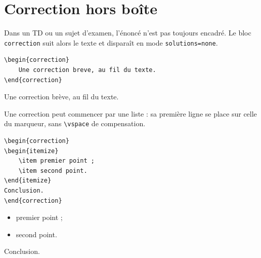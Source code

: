 \section{Correction hors boîte}%
\label{sec:correction}

Dans un TD ou un sujet d'examen, l'énoncé n'est pas toujours encadré. Le bloc
\texttt{correction} suit alors le texte et disparaît en mode
\texttt{solutions=none}.

\begin{lstlisting}
\begin{correction}
    Une correction breve, au fil du texte.
\end{correction}
\end{lstlisting}
\begin{correction}
    Une correction brève, au fil du texte.
\end{correction}

Une correction peut commencer par une liste : sa première ligne se place sur
celle du marqueur, sans \verb|\vspace| de compensation.

\begin{lstlisting}
\begin{correction}
\begin{itemize}
    \item premier point ;
    \item second point.
\end{itemize}
Conclusion.
\end{correction}
\end{lstlisting}
\begin{correction}
\begin{itemize}
    \item premier point ;
    \item second point.
\end{itemize}
Conclusion.
\end{correction}
